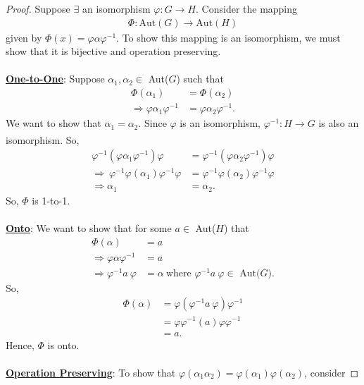 \documentclass[12pt, letterpaper]{article}
\begin{document}
\begin{proof}
    Suppose $\exists$ an isomorphism $\varphi: G \xrightarrow{} H$. Consider the mapping \begin{align*}
        \Phi: \text{Aut}(G) \xrightarrow{} \text{Aut}(H)
    \end{align*}
    given by $\Phi (x) = \varphi\alpha\varphi^{-1}$. To show this mapping is an isomorphism, we must show that it is bijective and operation preserving. \\ \\
    \underline{\textbf{One-to-One}}: Suppose $\alpha_{1}, \alpha_{2} \in$ Aut($G$) such that
    \begin{align*}
        \Phi(\alpha_1) &= \Phi(\alpha_2) \\
        \Rightarrow \varphi\alpha_1\varphi^{-1} &= \varphi\alpha_2\varphi^{-1}.
    \end{align*}
    We want to show that $\alpha_1 = \alpha_2$. Since $\varphi$ is an isomorphism, $\varphi^{-1}: H \xrightarrow[]{} G$ is also an isomorphism. So,
    \begin{align*}
        \varphi^{-1}(\varphi\alpha_1\varphi^{-1})\varphi &= \varphi^{-1}(\varphi\alpha_2\varphi^{-1})\varphi \\
        \Rightarrow \ \varphi^{-1}\varphi(\alpha_1)\varphi^{-1}\varphi &= \varphi^{-1}\varphi(\alpha_2)\varphi^{-1}\varphi \\
        \Rightarrow \alpha_1 &= \alpha_2. 
    \end{align*}
    So, $\Phi$ is 1-to-1. \\ \\
    \underline{\textbf{Onto}}: We want to show that for some $a \in$ Aut($H$) that 
    \begin{align*}
        \Phi(\alpha) &= a  \\
        \Rightarrow \varphi\alpha\varphi^{-1} &= a  \\
        \Rightarrow \varphi^{-1}a \ \varphi &= \alpha \ \text{where $\varphi^{-1}a \ \varphi \in$ Aut($G$)}.
    \end{align*}
    So,
    \begin{align*}
        \Phi(\alpha) &= \varphi(\varphi^{-1}a \ \varphi)\varphi^{-1} \\
        &= \varphi \varphi^{-1}(a)\varphi\varphi^{-1} \\
        &= a.
    \end{align*}
    Hence, $\Phi$ is onto. \\ \\
    \underline{\textbf{Operation Preserving}}: To show that $\varphi(\alpha_{1}\alpha_{2}) = \varphi(\alpha_{1})\varphi(\alpha_2)$, consider

\end{proof}
\end{document}
